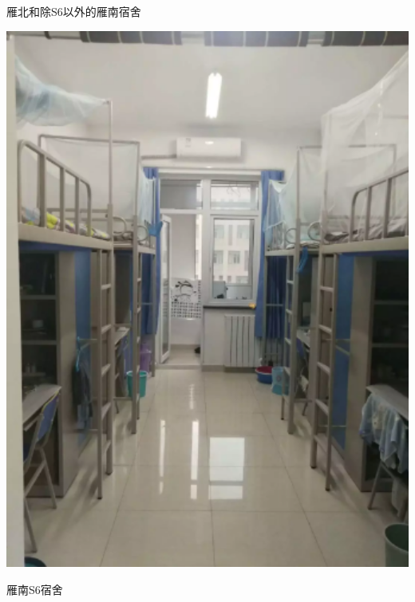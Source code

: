 \begin{center}
    \begin{minipage}{0.45\textwidth}
        \centerline{\sffamily\small 雁北和除S6以外的雁南宿舍}
        \centerline{\includegraphics[width=1\textwidth]{images/dorm.png}}
    \end{minipage}
    \qquad
    \begin{minipage}{0.45\textwidth}
        \centerline{\sffamily\small 雁南S6宿舍}

\end{minipage}
\end{center}
